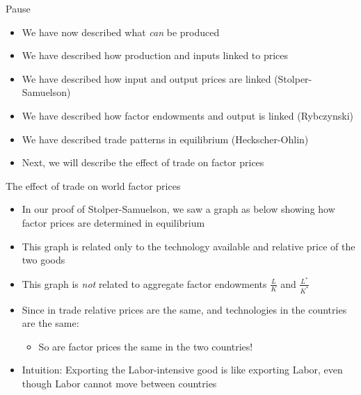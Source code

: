 \documentclass[ignorenonframetext,]{beamer}
\begin{document}
\begin{frame}{Pause}

    \begin{itemize}
        \item We have now described what \emph{can} be produced
        \item We have described how production and inputs linked to prices
        \item We have described how input and output prices are linked (Stolper-Samuelson)
        \item We have described how factor endowments and output is linked (Rybczynski) 
        \item We have described trade patterns in equilibrium (Heckscher-Ohlin)
        \item Next, we will describe the effect of trade on factor prices
    \end{itemize}

\end{frame}

\begin{frame}{The effect of trade on world factor prices}

    \begin{itemize} 
         \item In our proof of Stolper-Samuelson, we saw a graph as below showing how factor prices are determined in equilibrium
        \item This graph is related only to the technology available and relative price of the two goods 
        \item This graph is \emph{not} related to aggregate factor endowments $\frac{L}{K}$ and $\frac{L^*}{K^*}$
        \item Since in trade relative prices are the same, and technologies in the countries are the same:
        \begin{itemize}
            \item So are factor prices the same in the two countries!
        \end{itemize}
        \item Intuition: Exporting the Labor-intensive good is like exporting Labor, even though Labor cannot move between countries
     \end{itemize}

\end{frame}
\end{document}
